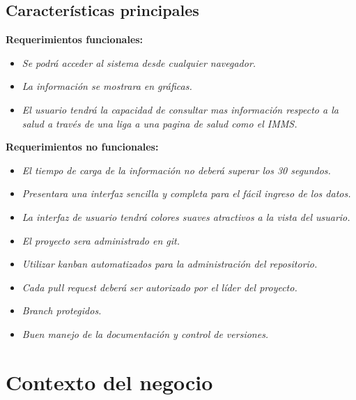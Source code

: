 \documentclass[12pt,a4paper]{book}
\begin{document}
\section{Características principales}
\vspace{0.5 cm}
\textbf {Requerimientos funcionales:}
\vspace{0.5 cm}
\begin{itemize}
\item \textit{Se podrá acceder al sistema desde cualquier navegador.}
\item \textit{La información se mostrara en gráficas.}
\item \textit{El usuario tendrá la capacidad de consultar mas información respecto a la salud a través de una liga a una pagina de salud como el IMMS.}
\end{itemize}
\textbf {Requerimientos no funcionales:}
\vspace{0.5 cm}
\begin{itemize}
\item \textit{El tiempo de carga de la información no deberá superar los 30 segundos.}
\item \textit{Presentara una interfaz sencilla y completa para el fácil ingreso de los datos.}
\item \textit{La interfaz de usuario tendrá colores suaves atractivos a la vista del usuario.}
\item \textit{El proyecto sera administrado en git.}
\item \textit{Utilizar kanban automatizados para la administración del repositorio.}
\item \textit{Cada pull request deberá ser autorizado por el líder del proyecto.}
\item \textit{Branch protegidos.}
\item \textit{Buen manejo de la documentación y control de versiones.}
\end{itemize}

\chapter{Contexto del negocio}
\end{document}
